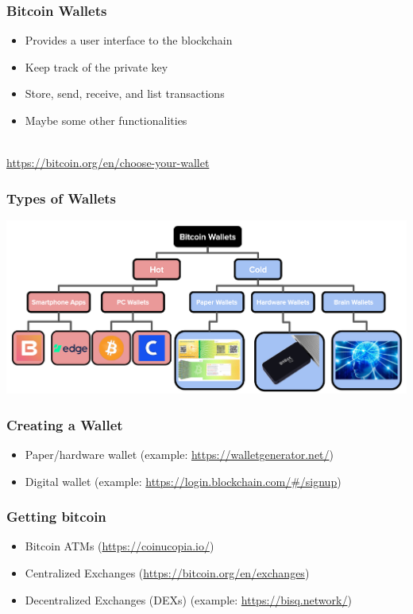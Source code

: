 \documentclass{beamer}
\begin{document}
\begin{frame}
  \frametitle{Bitcoin Wallets}
  \pause
  \begin{itemize}
  	\item Provides a user interface to the blockchain
	\item Keep track of the private key
	\item Store, send, receive, and list transactions
	\item Maybe some other  functionalities

  \end{itemize}
  $ $ \\ 
  \pause
  \url{https://bitcoin.org/en/choose-your-wallet}
\end{frame}
\begin{frame}
  \frametitle{Types of Wallets}
 	\centering
	\includegraphics[scale=0.4]{wallets}
\end{frame}
\begin{frame}
  \frametitle{Creating a Wallet}
  
	\begin{itemize}
		\item Paper/hardware  wallet (example: \url{https://walletgenerator.net/})
		\item Digital wallet (example: \url{https://login.blockchain.com/\#/signup})
	\end{itemize}
\end{frame}
\begin{frame}
  \frametitle{Getting bitcoin}
  	\begin{itemize}
  		\item Bitcoin ATMs (\url{https://coinucopia.io/}) \pause
  		\item Centralized Exchanges (\url{https://bitcoin.org/en/exchanges}) \pause
  		\item Decentralized Exchanges (DEXs) (example: \url{https://bisq.network/})
  	\end{itemize}
\end{frame}
\end{document}

